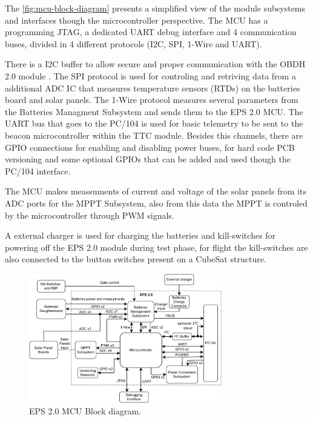 The \autoref{fig:mcu-block-diagram} presents a simplified view of the module subsystems and interfaces though the microcontroller perspective. 
The MCU has a programming JTAG, a dedicated UART debug interface and 4 communication buses, divided in 4 different protocols (I2C, SPI, 1-Wire and UART). 

There is a I2C buffer to allow secure and proper communication with the OBDH 2.0 module \cite{obdh2}.
The SPI protocol is used for controling and retriving data from a additional ADC IC that measures temperature sensors (RTDs) on the batteries board and solar panels.
The 1-Wire protocol measures several parameters from the Batteries Managment Subsystem and sends them to the EPS 2.0 MCU.
The UART bus that goes to the PC/104 is used for basic telemetry to be sent to the beacon microcontroller within the TTC module.
Besides this channels, there are GPIO connections for enabling and disabling power buses, for hard code PCB versioning and some optional GPIOs that can be added and used though the PC/104 interface. 

The MCU makes meassuments of current and voltage of the solar panels from its ADC ports for the MPPT Subsystem, also from this data the MPPT is controled by the microcontroller through PWM signals.

A external charger is used for charging the batteries and kill-switches for powering off the EPS 2.0 module during test phase, for flight the kill-switches are also connected to the button switches present on a CubeSat structure.   

\begin{figure}[!ht]
    \begin{center}
        \includegraphics[width=0.75\textwidth]{figures/eps2_mcu_diagram.pdf}
        \caption{EPS 2.0 MCU Block diagram.}
        \label{fig:mcu-block-diagram}
    \end{center}
\end{figure}

